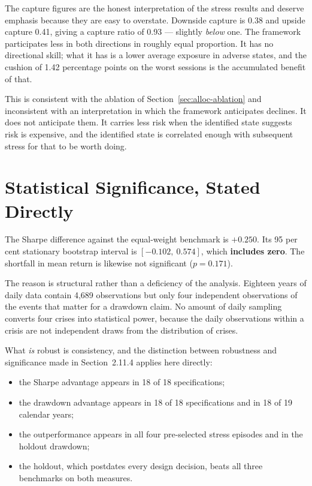 The capture figures are the honest interpretation of the stress results and deserve emphasis
because they are easy to overstate. Downside capture is 0.38 and upside capture 0.41, giving a
capture ratio of 0.93 --- slightly \emph{below} one. The framework participates less in both
directions in roughly equal proportion. It has no directional skill; what it has is a lower
average exposure in adverse states, and the cushion of 1.42 percentage points on the worst
sessions is the accumulated benefit of that.

This is consistent with the ablation of Section~\ref{sec:alloc-ablation} and inconsistent with an
interpretation in which the framework anticipates declines. It does not anticipate them. It carries
less risk when the identified state suggests risk is expensive, and the identified state is
correlated enough with subsequent stress for that to be worth doing.

\section{Statistical Significance, Stated Directly}
\label{sec:alloc-sig}

The Sharpe difference against the equal-weight benchmark is $+0.250$. Its 95 per cent stationary
bootstrap interval is $[-0.102,\ 0.574]$, which \textbf{includes zero}. The shortfall in mean
return is likewise not significant ($p = 0.171$).

The reason is structural rather than a deficiency of the analysis. Eighteen years of daily data
contain 4,689 observations but only four independent observations of the events that matter for a
drawdown claim. No amount of daily sampling converts four crises into statistical power, because
the daily observations within a crisis are not independent draws from the distribution of crises.

What \emph{is} robust is consistency, and the distinction between robustness and significance made
in Section~2.11.4 applies here directly:

\begin{itemize}
\item the Sharpe advantage appears in 18 of 18 specifications;
\item the drawdown advantage appears in 18 of 18 specifications and in 18 of 19 calendar years;
\item the outperformance appears in all four pre-selected stress episodes and in the holdout
drawdown;
\item the holdout, which postdates every design decision, beats all three benchmarks on both
measures.
\end{itemize}

